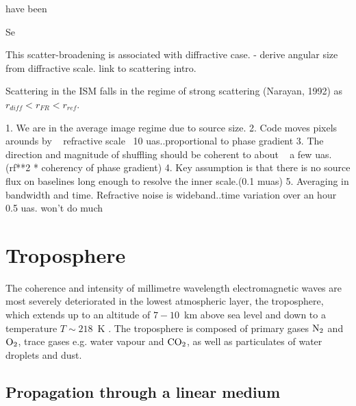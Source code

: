 


 have been 




Se

 This scatter-broadening is associated with diffractive case. - derive angular size from diffractive scale. link to scattering intro.


Scattering in the ISM falls in the regime of strong scattering (Narayan, 1992) as $r_{diff} < r_{FR} < r_{ref} $. 
                   

1. We are in the average image regime due to source size.
2. Code moves pixels arounds by ~ refractive scale ~10 uas..proportional to phase gradient 
3. The direction and magnitude of shuffling should be coherent to about ~ a few uas. (rf**2 * coherency of phase gradient)
4. Key assumption is that there is no source flux on baselines long enough to resolve the inner scale.(0.1 muas)
5. Averaging in bandwidth and time. Refractive noise is wideband..time variation over an hour ~ 0.5 uas. won't do much
\section{Troposphere}

The coherence and intensity of millimetre wavelength electromagnetic waves are most severely deteriorated in the lowest atmospheric layer, the troposphere, which extends up to an altitude of $7-10$~km above sea level and down to a temperature $T \sim 218$~K \citep{Thompson_2001}. The troposphere is composed of primary gases $\rm N_2$ and  $\rm O_2$, trace gases e.g. water vapour and $\rm CO_2$, as well as particulates of water droplets and dust. 

\subsection{Propagation through a linear medium}


